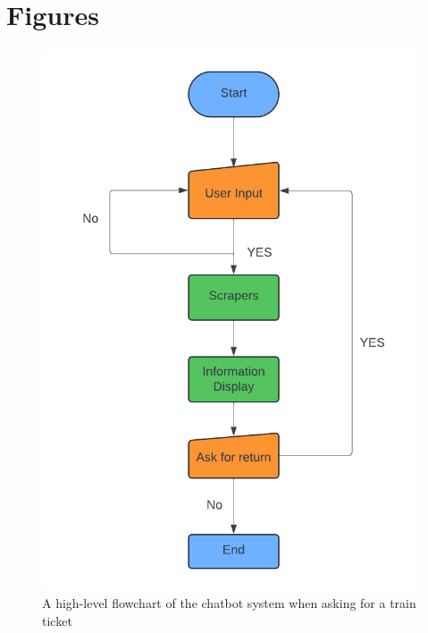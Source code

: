\newpage
\section{Figures}
\begin{figure}[!htbp]
    \centering
    \includegraphics[width=0.8\linewidth]{Diagrams/Flowcharts.png}
    \caption{A high-level flowchart of the chatbot system when asking for a train ticket}
    \label{Fig: Flowchart}
\end{figure}


